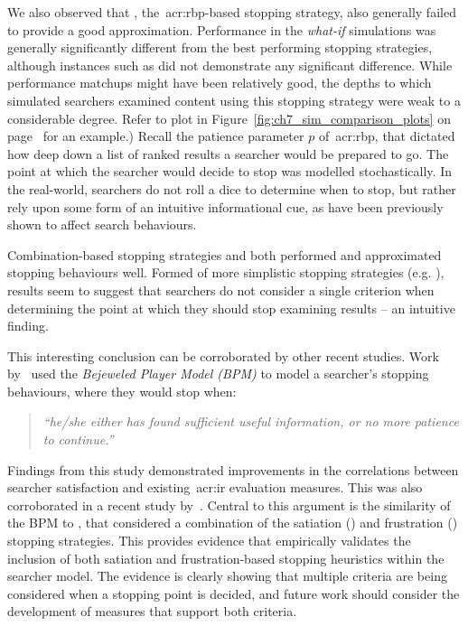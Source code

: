 We also observed that , the~\gls{acr:rbp}-based stopping strategy, also generally failed to provide a good approximation. Performance in the \emph{what-if} simulations was generally significantly different from the best performing stopping strategies, although instances such as  did not demonstrate any significant difference. While performance matchups might have been relatively good, the depths to which simulated searchers examined content using this stopping strategy were weak to a considerable degree. Refer to plot  in Figure~\ref{fig:ch7_sim_comparison_plots} on page~\pageref{fig:ch7_sim_comparison_plots} for an example.) Recall the patience parameter $p$ of~\gls{acr:rbp}, that dictated how deep down a list of ranked results a searcher would be prepared to go. The point at which the searcher would decide to stop was modelled stochastically. In the real-world, searchers do not roll a dice to determine when to stop, but rather rely upon some form of an intuitive informational cue, as have been previously shown to affect search behaviours.

Combination-based stopping strategies  and  both performed and approximated stopping behaviours well. Formed of more simplistic stopping strategies (e.g. ), results seem to suggest that searchers do not consider a single criterion when determining the point at which they should stop examining results -- an intuitive finding.

This interesting conclusion can be corroborated by other recent studies. Work by~\cite{zhang2017bejewled} used the \emph{Bejeweled Player Model (BPM)} to model a searcher's stopping behaviours, where they would stop when:

\begin{quote}
    \emph{``he/she either has found sufficient useful information, or no more patience to continue.''}
\end{quote}

Findings from this study demonstrated improvements in the correlations between searcher satisfaction and existing~\gls{acr:ir} evaluation measures. This was also corroborated in a recent study by~\cite{azzopardi2018cwl}. Central to this argument is the similarity of the BPM to , that considered a combination of the satiation () and frustration () stopping strategies. This provides evidence that empirically validates the inclusion of both satiation and frustration-based stopping heuristics within the searcher model. The evidence is clearly showing that multiple criteria are being considered when a stopping point is decided, and future work should consider the development of measures that support both criteria.

